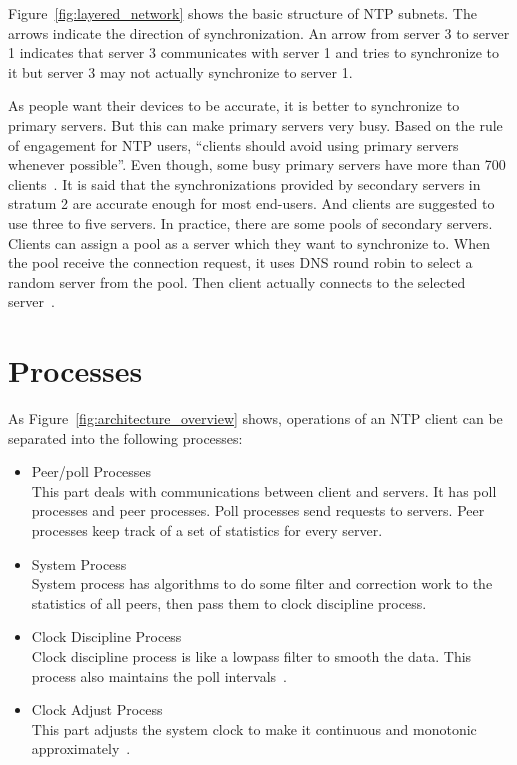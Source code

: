Figure~\ref{fig:layered_network} shows the basic structure of NTP subnets. The
arrows indicate the direction of synchronization. An arrow from server 3 to
server 1 indicates that server 3 communicates with server 1 and tries to
synchronize to it but server 3 may not actually synchronize to server 1.



As people want their devices to be accurate, it is better to synchronize to
primary servers. But this can make primary servers very busy. Based on the rule
of engagement for NTP users, ``clients should avoid using primary servers
whenever possible''. Even though, some busy primary servers have more than 700
clients~\cite{rules}. 
It is said that the synchronizations provided by secondary servers in stratum 2
are accurate enough for most end-users. And clients are suggested to use three
to five servers. In practice, there are some pools of secondary servers.
Clients can assign a pool as a server which they want to synchronize to. When
the pool receive the connection request, it uses DNS round robin to select a
random server from the pool. Then client actually connects to the selected
server~\cite{pool}.

\section{Processes}
\label{sec:processes}
As Figure~\ref{fig:architecture_overview} shows, operations of an NTP client
can be separated into the following processes:
\begin{itemize}
    \item Peer/poll Processes\\
        This part deals with communications between client and servers. It has
        poll processes and peer processes. Poll processes send requests to
        servers. Peer processes keep track of a set of statistics for every
        server.
    \item System Process\\
        System process has algorithms to do some filter and correction work to
        the statistics of all peers, then pass them to clock discipline
        process.
    \item Clock Discipline Process\\
        Clock discipline process is like a lowpass filter to smooth the data.
        This process also maintains the poll intervals~\cite{redbook}.
    \item Clock Adjust Process\\
        This part adjusts the system clock to make it continuous and monotonic
        approximately~\cite{redbook}. 
\end{itemize}

